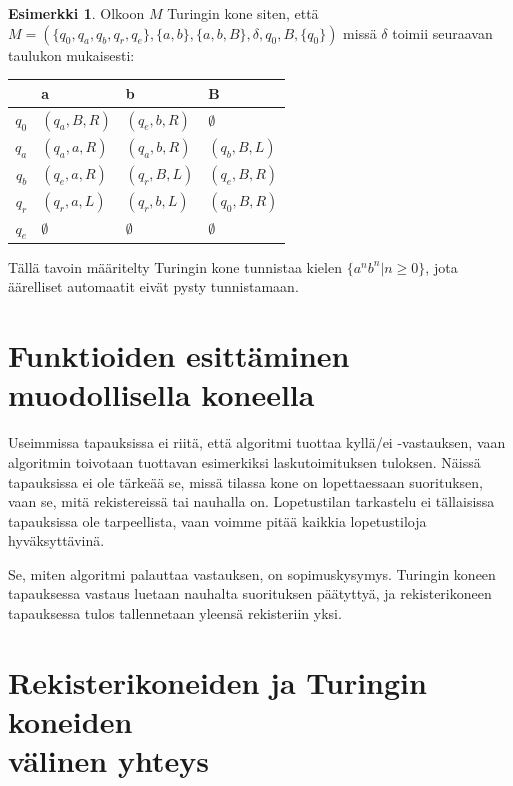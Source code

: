 \documentclass[a4paper, 12pt]{article}
\theoremstyle{definition}
\newtheorem{example}[mydef]{Esimerkki}
\theoremstyle{plain}
\begin{document}
\begin{example}
Olkoon $M$ Turingin kone siten, että\\$M = (\{q_0, q_a, q_b, q_r, q_e\}, \{a, b\}, \{a, b, B\}, \delta, q_0, B, \{q_0\})$ missä $\delta$ toimii seuraavan taulukon mukaisesti:

\begin{tabular}{r | l l l}
& a & b & B \\
\hline
$q_0$ & $(q_a, B, R)$ & $(q_e, b, R)$ & $\emptyset$ \\
$q_a$ & $(q_a, a, R)$ & $(q_a, b, R)$ & $(q_b, B, L)$ \\
$q_b$ & $(q_e, a, R)$ & $(q_r, B, L)$ & $(q_e, B, R)$\\
$q_r$ & $(q_r, a, L)$ & $(q_r, b, L)$ & $(q_0, B, R)$\\
$q_e$ & $\emptyset$ & $\emptyset$ & $\emptyset$ \\ 
\end{tabular}

Tällä tavoin määritelty Turingin kone tunnistaa kielen $\{a^nb^n | n \geq 0\}$, jota äärelliset automaatit eivät pysty tunnistamaan.

\end{example}

\section{Funktioiden esittäminen muodollisella koneella}

Useimmissa tapauksissa ei riitä, että algoritmi tuottaa kyllä/ei -vastauksen, vaan algoritmin toivotaan tuottavan esimerkiksi laskutoimituksen tuloksen. Näissä tapauksissa ei ole tärkeää se, missä tilassa kone on lopettaessaan suorituksen, vaan se, mitä rekistereissä tai nauhalla on. Lopetustilan tarkastelu ei tällaisissa tapauksissa ole tarpeellista, vaan voimme pitää kaikkia lopetustiloja hyväksyttävinä.

Se, miten algoritmi palauttaa vastauksen, on sopimuskysymys. Turingin koneen tapauksessa vastaus luetaan nauhalta suorituksen päätyttyä, ja rekisterikoneen tapauksessa tulos tallennetaan yleensä rekisteriin yksi.

\section{Rekisterikoneiden ja Turingin koneiden\\ välinen yhteys}
\end{document}
